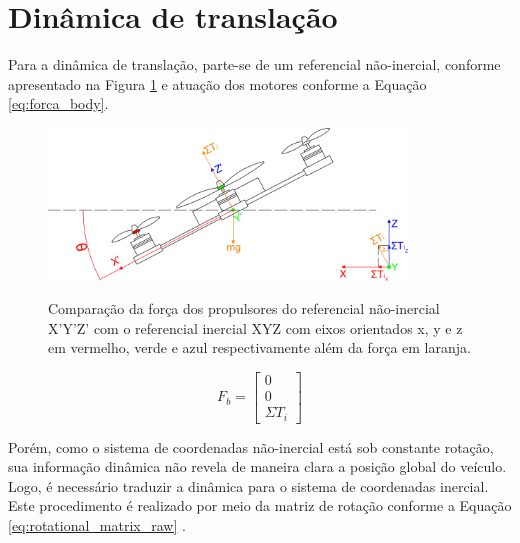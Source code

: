\documentclass[main.tex]{subfiles}
\begin{document}
\section{Dinâmica de translação}

Para a dinâmica de translação, parte-se de um referencial não-inercial, conforme apresentado na Figura \ref{fig:ref_frame} e atuação dos motores conforme a Equação \ref{eq:forca_body}.

\begin{figure}[!h]
    \centering
    \caption{Comparação da força dos propulsores do referencial não-inercial X'Y'Z' com o referencial inercial XYZ com eixos orientados x, y e z em vermelho, verde e azul respectivamente além da força em laranja.}
    \includegraphics[width=0.85\textwidth]{capitulos/modelagem/imgs/ref_frame.png}
    \label{fig:ref_frame}
\end{figure}

\begin{equation}\label{eq:forca_body}
    F_b = \begin{bmatrix}
        0\\
        0\\
        \Sigma T_i
    \end{bmatrix}
\end{equation}

Porém, como o sistema de coordenadas não-inercial está sob constante rotação, sua informação dinâmica não revela de maneira clara a posição global do veículo. Logo, é necessário traduzir a dinâmica para o sistema de coordenadas inercial. Este procedimento é realizado por meio da matriz de rotação conforme a Equação \ref{eq:rotational_matrix_raw} \cite{robotica}.
\end{document}
